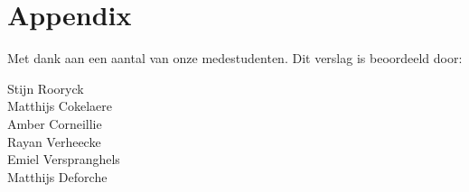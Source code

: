 \documentclass[a4paper,twoside,kulak]{kulakreport} %
\begin{document}

\newpage

\appendix
\section*{Appendix}
Met dank aan een aantal van onze medestudenten. Dit verslag is beoordeeld door:
\begin{table}[h]
	
	Stijn Rooryck \\
	Matthijs Cokelaere \\
	Amber Corneillie \\
	Rayan Verheecke \\
	Emiel Verspranghels\\
	Matthijs Deforche 

\end{table}
\end{document}
